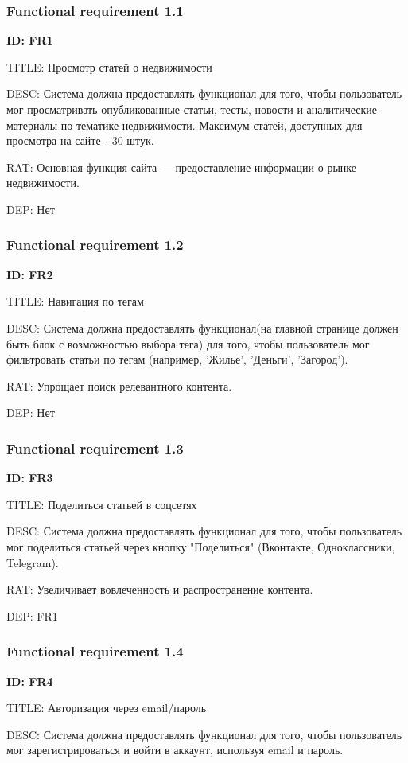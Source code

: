 \documentclass{scrreprt}
\begin{document}
\subsubsection{Functional requirement 1.1}
\textbf{ID: FR1}

TITLE: Просмотр статей о недвижимости

DESC: Система должна предоставлять функционал для того, чтобы пользователь мог просматривать опубликованные статьи, тесты, новости и аналитические материалы по тематике недвижимости. Максимум статей, доступных для просмотра на сайте - 30 штук. 

RAT: Основная функция сайта — предоставление информации о рынке 
недвижимости.

DEP: Нет
\subsubsection{Functional requirement 1.2}
\textbf{ID: FR2}

TITLE: Навигация по тегам

DESC: Система должна предоставлять функционал(на главной странице должен быть блок с возможностью выбора тега) для того, чтобы пользователь мог фильтровать статьи по тегам (например, 'Жилье', 'Деньги', 'Загород'). 

RAT: Упрощает поиск релевантного контента.

DEP: Нет
\subsubsection{Functional requirement 1.3}
\textbf{ID: FR3}

TITLE: Поделиться статьей в соцсетях

DESC: Система должна предоставлять функционал для того, чтобы пользователь мог поделиться статьей через кнопку "Поделиться" (Вконтакте, Одноклассники, Telegram).

RAT: Увеличивает вовлеченность и распространение контента.

DEP: FR1
\subsubsection{Functional requirement 1.4}
\textbf{ID: FR4}

TITLE: Авторизация через email/пароль

DESC: Система должна предоставлять функционал для того, чтобы пользователь мог зарегистрироваться и войти в аккаунт, используя email и пароль.
\end{document}
